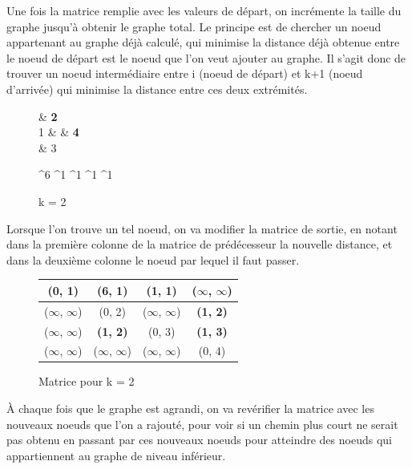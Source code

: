 \documentclass[a4paper,12pt,final] {article}
\begin{document}
Une fois la matrice remplie avec les valeurs de départ, on incrémente la taille du graphe jusqu'à obtenir le graphe total. Le principe est de chercher un noeud appartenant au graphe déjà calculé, qui minimise la distance déjà obtenue entre le noeud de départ est le noeud que l'on veut ajouter au graphe. Il s'agit donc de trouver un noeud intermédiaire entre i (noeud de départ) et  k+1 (noeud d'arrivée) qui minimise la distance entre ces deux extrémités.\\

\begin{figure}[H]
 \centering
 \begin{psmatrix}[mnode=circle]
	    & {\color{red} \bf 2}\\
	 1 &    & {\color{red} \bf 4}\\
	    & 3\\
\end{psmatrix}
	
	^{6}
	^{1}
	^{1}
	^{1}
	^{1}

  \caption{k = 2}
\end{figure}

Lorsque l'on trouve un tel noeud, on va modifier la matrice de sortie, en notant dans la première colonne de la matrice de prédécesseur la nouvelle distance, et dans la deuxième colonne le noeud par lequel il faut passer.\\

\begin{figure}[H]
\begin{center}
\begin{tabular}{|c|c|c|c|}
\hline
(0, 1) & (6, 1) & (1, 1) & ($\infty$, $\infty$) \\
\hline
($\infty$, $\infty$) & (0, 2) & ($\infty$, $\infty$) & {\color{red} \bf (1, 2)} \\
\hline
($\infty$, $\infty$) & {\color{red} \bf (1, 2)} & (0, 3) & {\color{red} \bf (1, 3)}\\
\hline
($\infty$, $\infty$) & ($\infty$, $\infty$) & ($\infty$, $\infty$) & (0, 4) \\
\hline
\end{tabular}
\end{center}
\caption{Matrice pour k = 2}
\end{figure}

À chaque fois que le graphe est agrandi, on va revérifier la matrice avec les nouveaux noeuds que l'on a rajouté, pour voir si un chemin plus court ne serait pas obtenu en passant par ces nouveaux noeuds pour atteindre des noeuds qui appartiennent au graphe de niveau inférieur.\\
\end{document}
